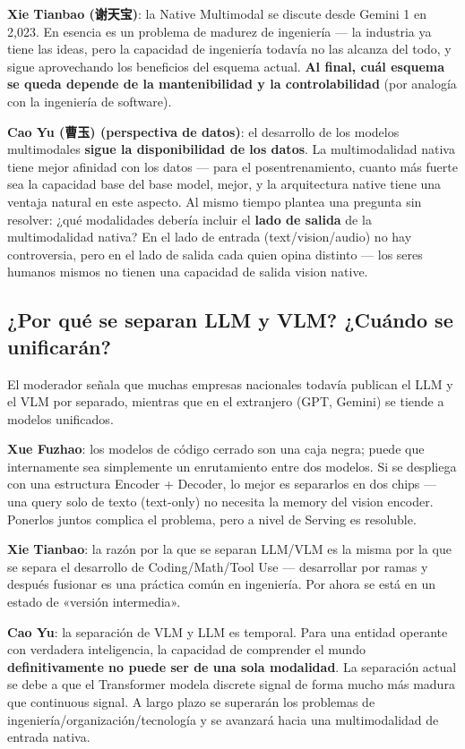 \textbf{Xie Tianbao (谢天宝)}: la Native Multimodal se discute desde Gemini 1 en 2,023. En esencia es un problema de madurez de ingeniería — la industria ya tiene las ideas, pero la capacidad de ingeniería todavía no las alcanza del todo, y sigue aprovechando los beneficios del esquema actual. \textbf{Al final, cuál esquema se queda depende de la mantenibilidad y la controlabilidad} (por analogía con la ingeniería de software).

\textbf{Cao Yu (曹玉) (perspectiva de datos)}: el desarrollo de los modelos multimodales \textbf{sigue la disponibilidad de los datos}. La multimodalidad nativa tiene mejor afinidad con los datos — para el posentrenamiento, cuanto más fuerte sea la capacidad base del base model, mejor, y la arquitectura native tiene una ventaja natural en este aspecto. Al mismo tiempo plantea una pregunta sin resolver: ¿qué modalidades debería incluir el \textbf{lado de salida} de la multimodalidad nativa? En el lado de entrada (text/vision/audio) no hay controversia, pero en el lado de salida cada quien opina distinto — los seres humanos mismos no tienen una capacidad de salida vision native.

\subsection{¿Por qué se separan LLM y VLM? ¿Cuándo se unificarán?}

El moderador señala que muchas empresas nacionales todavía publican el LLM y el VLM por separado, mientras que en el extranjero (GPT, Gemini) se tiende a modelos unificados.

\textbf{Xue Fuzhao}: los modelos de código cerrado son una caja negra; puede que internamente sea simplemente un enrutamiento entre dos modelos. Si se despliega con una estructura Encoder + Decoder, lo mejor es separarlos en dos chips — una query solo de texto (text-only) no necesita la memory del vision encoder. Ponerlos juntos complica el problema, pero a nivel de Serving es resoluble.

\textbf{Xie Tianbao}: la razón por la que se separan LLM/VLM es la misma por la que se separa el desarrollo de Coding/Math/Tool Use — desarrollar por ramas y después fusionar es una práctica común en ingeniería. Por ahora se está en un estado de «versión intermedia».

\textbf{Cao Yu}: la separación de VLM y LLM es temporal. Para una entidad operante con verdadera inteligencia, la capacidad de comprender el mundo \textbf{definitivamente no puede ser de una sola modalidad}. La separación actual se debe a que el Transformer modela discrete signal de forma mucho más madura que continuous signal. A largo plazo se superarán los problemas de ingeniería/organización/tecnología y se avanzará hacia una multimodalidad de entrada nativa.

